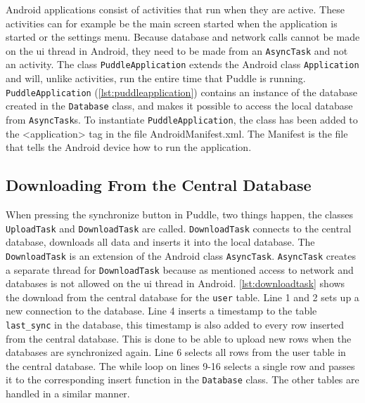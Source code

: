 

Android applications consist of activities that run when they are active. These activities can for example be the main screen started when the application is started or the settings menu. Because database and network calls cannot be made on the \ac{ui} thread in Android, they need to be made from an \lstinline|AsyncTask| \citep{asynctask} and not an activity. The class \lstinline|PuddleApplication| extends the Android class \lstinline|Application| and will, unlike activities, run the entire time that Puddle is running. \lstinline|PuddleApplication| (\autoref{lst:puddleapplication}) contains an instance of the database created in the \lstinline|Database| class, and makes it possible to access the local database from \lstinline|AsyncTask|s. To instantiate \lstinline|PuddleApplication|, the class has been added to the <application> tag in the file AndroidManifest.xml. The Manifest is the file that tells the Android device how to run the application.



\subsection{Downloading From the Central Database}
When pressing the synchronize button in Puddle, two things happen, the classes \lstinline|UploadTask| and \lstinline|DownloadTask| are called. \lstinline|DownloadTask| connects to the central database, downloads all data and inserts it into the local database. The \lstinline|DownloadTask| is an extension of the Android class \lstinline|AsyncTask|. \lstinline|AsyncTask| creates a separate thread for \lstinline|DownloadTask| because as mentioned access to network and databases is not allowed on the \ac{ui} thread in Android.
\autoref{lst:downloadtask} shows the download from the central database for the \lstinline|user| table. Line 1 and 2 sets up a new connection to the database. Line 4 inserts a timestamp to the table \lstinline|last_sync| in the database, this timestamp is also added to every row inserted from the central database. This is done to be able to upload new rows when the databases are synchronized again. Line 6 selects all rows from the user table in the central database. The while loop on lines 9-16 selects a single row and passes it to the corresponding insert function in the \lstinline|Database| class. The other tables are handled in a similar manner.

